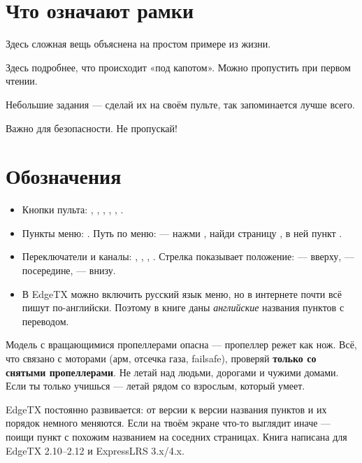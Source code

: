 \section*{Что означают рамки}

\begin{simple}
Здесь сложная вещь объяснена на простом примере из жизни.
\end{simple}

\begin{whyit}
Здесь подробнее, что происходит «под капотом». Можно пропустить при первом чтении.
\end{whyit}

\begin{tryit}
Небольшие задания --- сделай их на своём пульте, так запоминается лучше всего.
\end{tryit}

\begin{caution}
Важно для безопасности. Не пропускай!
\end{caution}

\section*{Обозначения}

\begin{itemize}
  \item Кнопки пульта: , , , , , .
  \item Пункты меню: . Путь по меню:  ---
        нажми , найди страницу , в ней пункт .
  \item Переключатели и каналы: , , , . Стрелка показывает
        положение:  --- вверху,  --- посередине,  --- внизу.
  \item В EdgeTX можно включить русский язык меню, но в интернете почти всё пишут
        по-английски. Поэтому в книге даны \emph{английские} названия пунктов с переводом.
\end{itemize}

\begin{caution}
Модель с вращающимися пропеллерами опасна --- пропеллер режет как нож. Всё, что связано
с моторами (арм, отсечка газа, failsafe), проверяй \textbf{только со снятыми пропеллерами}.
Не летай над людьми, дорогами и чужими домами. Если ты только учишься --- летай рядом со
взрослым, который умеет.
\end{caution}

\begin{note}
EdgeTX постоянно развивается: от версии к версии названия пунктов и их порядок немного
меняются. Если на твоём экране что-то выглядит иначе --- поищи пункт с похожим названием
на соседних страницах. Книга написана для EdgeTX 2.10--2.12 и ExpressLRS 3.x/4.x.
\end{note}
